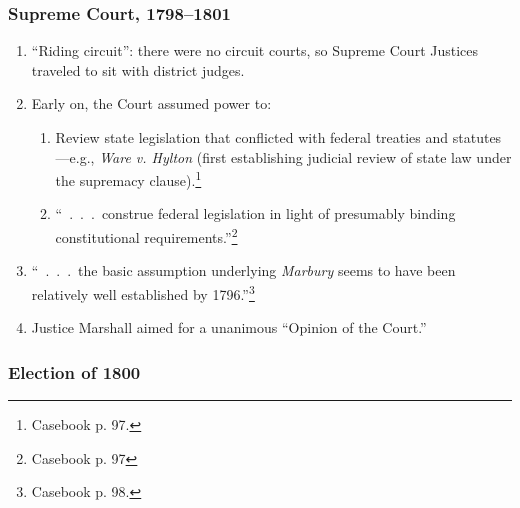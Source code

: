 \subsubsection{Supreme Court, 1798--1801}

\begin{enumerate}
    \item ``Riding circuit'': there were no circuit courts, so Supreme Court 
    Justices traveled to sit with district judges.
    \item Early on, the Court assumed power to:
    \begin{enumerate}
        \item Review state legislation that conflicted with 
        federal treaties and statutes---e.g., \emph{Ware v. Hylton} (first 
        establishing judicial review of state law under the supremacy 
        clause).\footnote{Casebook p. 97.}
        \item ``~.~.~.~construe federal legislation in light of 
        presumably binding constitutional requirements.''\footnote{Casebook p. 
        97}
    \end{enumerate}
    \item ``~.~.~.~the basic assumption underlying \emph{Marbury} seems to 
    have been relatively well established by 1796.''\footnote{Casebook p. 98.}
    \item Justice Marshall aimed for a unanimous ``Opinion of the Court.''
\end{enumerate}

\subsubsection{Election of 1800}

